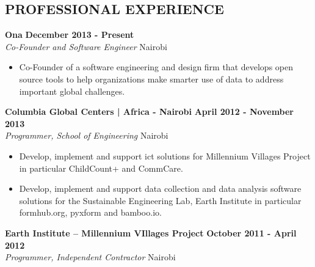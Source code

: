 \documentclass{res}
\begin{document}
\thispagestyle{empty} %

\address{ P.O. Box 625 (00605) \\   Uthiru, Kenya \\ +254.720.395.121}

\address{ukanga@ona.io}

\begin{resume}

\section{PROFESSIONAL EXPERIENCE}

\vspace{8pt}
\textbf{Ona} \hfill        \textbf{December 2013 - Present} \\
\emph{Co-Founder and Software Engineer}       \hfill   Nairobi

\begin{itemize} \itemsep -2pt %
        \item Co-Founder of a software engineering and design firm that develops open source tools to help organizations make smarter use of data to address important global challenges.

 \end{itemize} \vspace{-4pt}

\vspace{8pt}
\textbf{Columbia Global Centers | Africa - Nairobi} \hfill        \textbf{April 2012 - November 2013} \\
\emph{Programmer, School of Engineering}       \hfill   Nairobi

\begin{itemize} \itemsep -2pt %
        \item Develop, implement and support ict solutions for Millennium Villages Project in particular ChildCount+ and CommCare.
        \item Develop, implement and support data collection and data analysis software solutions for the Sustainable Engineering Lab, Earth Institute in particular formhub.org, pyxform and bamboo.io.
 \end{itemize} \vspace{-4pt}

\vspace{8pt}
\textbf{Earth Institute – Millennium VIllages Project} \hfill        \textbf{October 2011 - April 2012} \\
\emph{Programmer, Independent Contractor}       \hfill   Nairobi


\end{resume}
\end{document}
